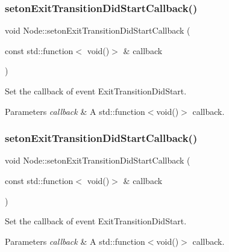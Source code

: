 \subsubsection{\texorpdfstring{seton\+Exit\+Transition\+Did\+Start\+Callback()}{setonExitTransitionDidStartCallback()}\hspace{0.1cm}{\footnotesize\ttfamily [1/2]}}
{\footnotesize\ttfamily void Node\+::seton\+Exit\+Transition\+Did\+Start\+Callback (\begin{DoxyParamCaption}\item[{const std\+::function$<$ void()$>$ \&}]{callback }\end{DoxyParamCaption})\hspace{0.3cm}{\ttfamily [inline]}}

Set the callback of event Exit\+Transition\+Did\+Start. 
\begin{DoxyParams}{Parameters}
{\em callback} & A std\+::function$<$void()$>$ callback. \\
\hline
\end{DoxyParams}
\mbox{\label{classNode_aca0270c92c148c57b0605aae8298e356}} 
\subsubsection{\texorpdfstring{seton\+Exit\+Transition\+Did\+Start\+Callback()}{setonExitTransitionDidStartCallback()}\hspace{0.1cm}{\footnotesize\ttfamily [2/2]}}
{\footnotesize\ttfamily void Node\+::seton\+Exit\+Transition\+Did\+Start\+Callback (\begin{DoxyParamCaption}\item[{const std\+::function$<$ void()$>$ \&}]{callback }\end{DoxyParamCaption})\hspace{0.3cm}{\ttfamily [inline]}}

Set the callback of event Exit\+Transition\+Did\+Start. 
\begin{DoxyParams}{Parameters}
{\em callback} & A std\+::function$<$void()$>$ callback. \\
\hline
\end{DoxyParams}
\mbox{\label{classNode_ae41a9db63bfa3d466ee7c9d79c35352d}} 
